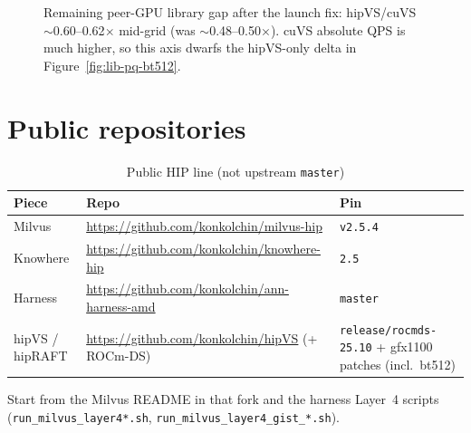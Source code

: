 \documentclass[11pt,a4paper]{article}
\begin{document}
\begin{figure}[H]
\centering
{}
\caption{Remaining peer-GPU library gap after the launch fix:
hipVS/cuVS $\sim$0.60--0.62$\times$ mid-grid (was $\sim$0.48--0.50$\times$).
cuVS absolute QPS is much higher, so this axis dwarfs the hipVS-only delta
in Figure~\ref{fig:lib-pq-bt512}.}
\label{fig:lib-pq}
\end{figure}

\section{Public repositories}
\label{sec:repos}

\begin{table}[H]
\centering
\caption{Public HIP line (not upstream \texttt{master})}
\label{tab:repos}
\begin{tabular}{@{}llp{}@{}}
\toprule
\textbf{Piece} & \textbf{Repo} & \textbf{Pin} \\
\midrule
Milvus & \url{https://github.com/konkolchin/milvus-hip} & \texttt{v2.5.4} \\
Knowhere & \url{https://github.com/konkolchin/knowhere-hip} & \texttt{2.5} \\
Harness & \url{https://github.com/konkolchin/ann-harness-amd} & \texttt{master} \\
hipVS / hipRAFT & \url{https://github.com/konkolchin/hipVS} (+ ROCm-DS)
  & \texttt{release/rocmds-25.10} + gfx1100 patches (incl.\ bt512) \\
\bottomrule
\end{tabular}
\end{table}

\noindent Start from the Milvus README in that fork and the harness Layer~4 scripts
(\texttt{run\_milvus\_layer4*.sh}, \texttt{run\_milvus\_layer4\_gist\_*.sh}).
\end{document}
